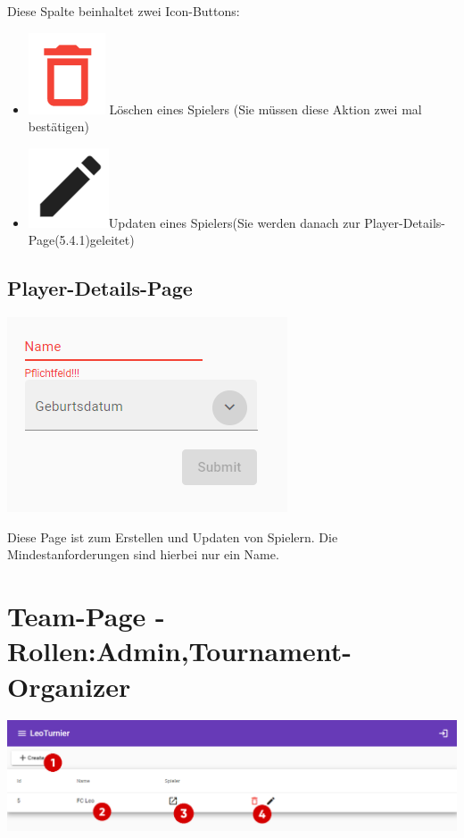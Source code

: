 Diese Spalte beinhaltet zwei Icon-Buttons:
\begin{itemize}
    \item \includegraphics[scale=0.3]{pics/user-guide/delete-icon.PNG} Löschen eines Spielers (Sie müssen diese Aktion zwei mal bestätigen)
    \item\includegraphics[scale=0.3]{pics/user-guide/edit-icon.PNG}Updaten eines Spielers(Sie werden danach zur Player-Details-Page(5.4.1)geleitet)
\end{itemize}
\subsection{Player-Details-Page}
\includegraphics[scale=0.8]{pics/user-guide/player-create-page.PNG}

Diese Page ist zum Erstellen und Updaten von Spielern. Die Mindestanforderungen sind hierbei nur ein Name.


\section{Team-Page - Rollen:Admin,Tournament-Organizer}
\includegraphics[scale=0.44]{pics/user-guide/team-overview-page.PNG}
\bigskip


